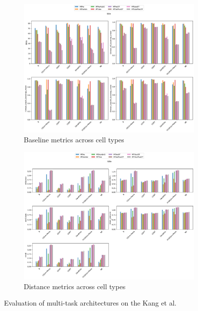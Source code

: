 \documentclass[12pt, a4paper]{article}
\begin{document}
\begin{figure}[h!]
    \centering
    \begin{subfigure}[t]{0.48\textwidth}
        \centering
        \includegraphics[width=\textwidth]{multi_task_benchmarking_cell_type_baseline_metrics_pbmc.png}
        \caption{Baseline metrics across cell types}
        \label{}
    \end{subfigure}
    \hfill
    \begin{subfigure}[t]{0.48\textwidth}
        \centering
        \includegraphics[width=\textwidth]{multi_task_benchmarking_cell_type_distance_metrics_pbmc.png}
        \caption{Distance metrics across cell types}
        \label{}
    \end{subfigure}
    \caption{Evaluation of multi-task architectures on the Kang et al. \cite{kang2018multiplexed}}
    \label{fig:all_multi_task_kang}
\end{figure}
\end{document}
